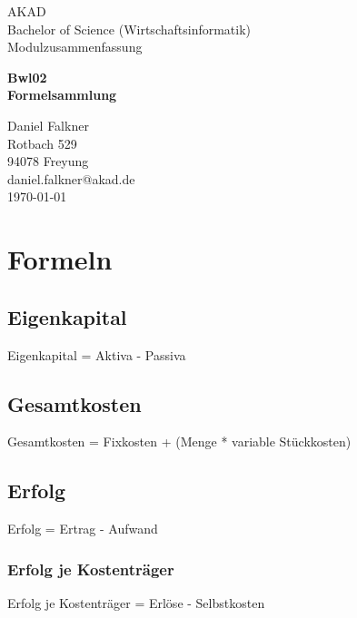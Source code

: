 \documentclass[a4paper,12pt]{scrartcl}
\begin{document}
\begin{titlepage}
\begin{small}
\vfill {AKAD\\ 
Bachelor of Science (Wirtschaftsinformatik) \\ 
Modulzusammenfassung}
\end{small}


\begin{center}
\begin{Large}
\vfill {\textsf{\textbf{
Bwl02 \\
\vspace*{1cm} 
Formelsammlung
}}}
\end{Large}
\end{center}

\begin{small}
\vfill Daniel Falkner \\ Rotbach 529 \\  94078 Freyung \\  daniel.falkner@akad.de \\ 
\today
\end{small}

\end{titlepage}


\tableofcontents
\thispagestyle{empty}

\clearpage

\onehalfspacing

\pagestyle{plain}


\section{Formeln}

\subsection{Eigenkapital}
Eigenkapital = Aktiva - Passiva
\subsection{Gesamtkosten}
Gesamtkosten = Fixkosten + (Menge * variable Stückkosten)
\subsection{Erfolg}
Erfolg = Ertrag - Aufwand
\subsubsection{Erfolg je Kostenträger}
Erfolg je Kostenträger = Erlöse - Selbstkosten 
\end{document}
